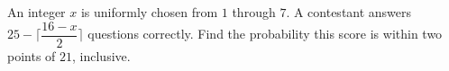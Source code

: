 An integer $x$ is uniformly chosen from $1$ through $7$. A contestant answers $25-\lceil\dfrac{16-x}{2}\rceil$ questions correctly. Find the probability this score is within two points of $21$, inclusive.
